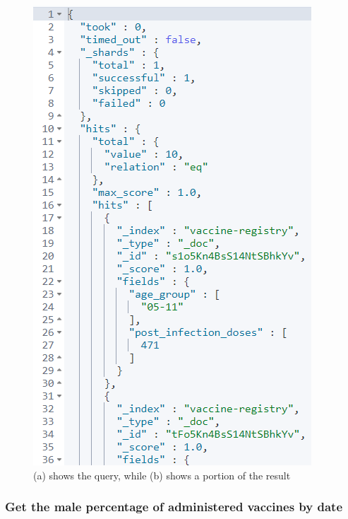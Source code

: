 \documentclass{article}[IEEEtran]
\begin{document}
\begin{figure}[H]
\begin{center}
\begin{minipage}[b]{0.4\textwidth}
    \includegraphics[width=\textwidth, frame]{Answer_Query_9.PNG}
     \subcaption{}
  \end{minipage}
  \caption{(a) shows the query, while (b) shows a portion of the result}
\end{center}
\end{figure}

\subsubsection{Get the male percentage of administered vaccines by date}\label{ssec:q10}
\end{document}
